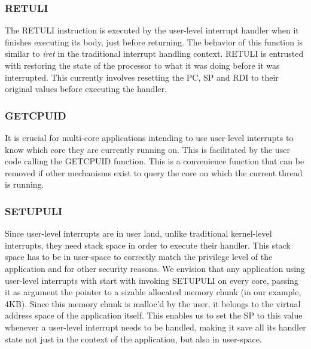 \subsubsection{RETULI}
The RETULI instruction is executed by the user-level interrupt handler when it
finishes executing its body, just before returning. The behavior of this
function is similar to \textit{iret} in the traditional interrupt handling
context. RETULI is entrusted with restoring the state of the processor to what
it was doing before it was interrupted. This currently involves resetting the
PC, SP and RDI to their original values before executing the handler.

\subsubsection{GETCPUID}
It is crucial for multi-core applications intending to use user-level interrupts
to know which core they are currently running on. This is facilitated by the
user code calling the GETCPUID function. This is a convenience function that can
be removed if other mechanisms exist to query the core on which the current
thread is running.

\subsubsection{SETUPULI}
Since user-level interrupts are in user land, unlike traditional kernel-level
interrupts, they need stack space in order to execute their handler. This stack
space has to be in user-space to correctly match the privilege level of the
application and for other security reasons. We envision that any application
using user-level interrupts with start with invoking SETUPULI on every core,
passing it as argument the pointer to a sizable allocated memory chunk (in our
example, 4KB). Since this memory chunk is malloc'd by the user, it belongs to
the virtual address space of the application itself. This enables us to set the
SP to this value whenever a user-level interrupt needs to be handled, making it
save all its handler state not just in the context of the application, but also
in user-space.

